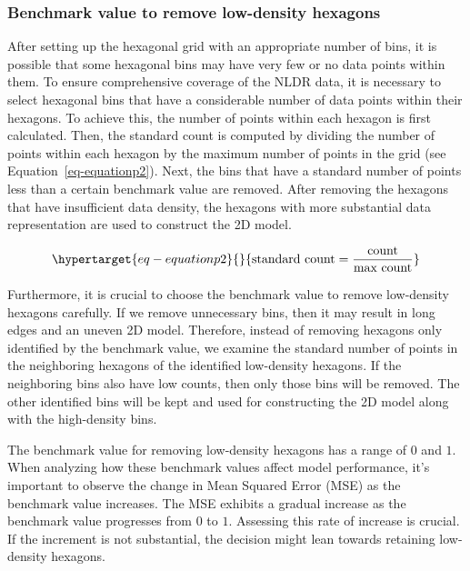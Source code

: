 \documentclass[
  12pt]{article}
\begin{document}
\hypertarget{benchmark-value-to-remove-low-density-hexagons}{%
\subsubsection{Benchmark value to remove low-density
hexagons}\label{benchmark-value-to-remove-low-density-hexagons}}

After setting up the hexagonal grid with an appropriate number of bins,
it is possible that some hexagonal bins may have very few or no data
points within them. To ensure comprehensive coverage of the NLDR data,
it is necessary to select hexagonal bins that have a considerable number
of data points within their hexagons. To achieve this, the number of
points within each hexagon is first calculated. Then, the standard count
is computed by dividing the number of points within each hexagon by the
maximum number of points in the grid (see Equation~\ref{eq-equationp2}).
Next, the bins that have a standard number of points less than a certain
benchmark value are removed. After removing the hexagons that have
insufficient data density, the hexagons with more substantial data
representation are used to construct the 2D model.

\begin{equation}\protect\hypertarget{eq-equationp2}{}{
\text{standard count} = \frac{\text{count}}{\text{max count}} 
}\label{eq-equationp2}\end{equation}

Furthermore, it is crucial to choose the benchmark value to remove
low-density hexagons carefully. If we remove unnecessary bins, then it
may result in long edges and an uneven 2D model. Therefore, instead of
removing hexagons only identified by the benchmark value, we examine the
standard number of points in the neighboring hexagons of the identified
low-density hexagons. If the neighboring bins also have low counts, then
only those bins will be removed. The other identified bins will be kept
and used for constructing the 2D model along with the high-density bins.

The benchmark value for removing low-density hexagons has a range of
\(0\) and \(1\). When analyzing how these benchmark values affect model
performance, it's important to observe the change in Mean Squared Error
(MSE) as the benchmark value increases. The MSE exhibits a gradual
increase as the benchmark value progresses from \(0\) to \(1\).
Assessing this rate of increase is crucial. If the increment is not
substantial, the decision might lean towards retaining low-density
hexagons.
\end{document}
